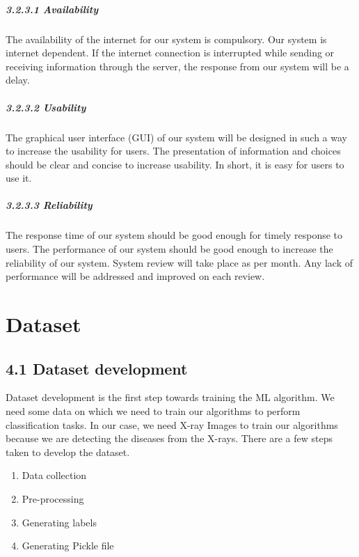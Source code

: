 \documentclass{article} %
\begin{document}
\noindent 
\subparagraph{3.2.3.1 Availability}

\noindent The availability of the internet for our system is compulsory. Our system is internet dependent. If the internet connection is interrupted while sending or receiving information through the server, the response from our system will be a delay.

\noindent 
\subparagraph{3.2.3.2 Usability}

\noindent The graphical user interface (GUI) of our system will be designed in such a way to increase the usability for users. The presentation of information and choices should be clear and concise to increase usability. In short, it is easy for users to use it.

\noindent 
\subparagraph{3.2.3.3 Reliability}

\noindent The response time of our system should be good enough for timely response to users. The performance of our system should be good enough to increase the reliability of our system. System review will take place as per month. Any lack of performance will be addressed and improved on each review.

\noindent 

\noindent 

\noindent \eject 

\textbf{       }


\section{ Dataset}

\noindent 
\subsection{4.1 Dataset development}

\noindent Dataset development is the first step towards training the ML algorithm. We need some data on which we need to train our algorithms to perform classification tasks. In our case, we need X-ray Images to train our algorithms because we are detecting the diseases from the X-rays. There are a few steps taken to develop the dataset.

\begin{enumerate}
\item  Data collection

\item  Pre-processing

\item  Generating labels

\item  Generating Pickle file
\end{enumerate}
\end{document}
